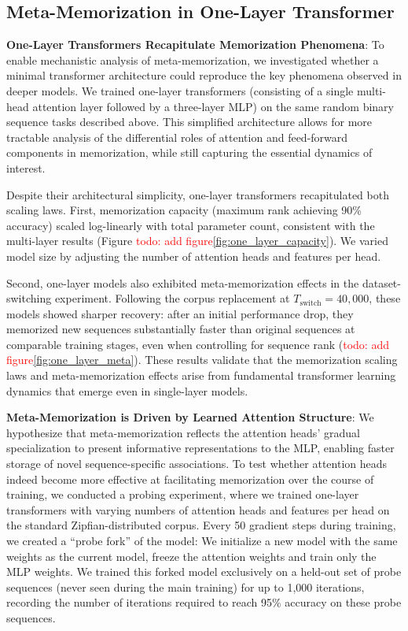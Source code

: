 \documentclass{article}
\theoremstyle{plain}
\theoremstyle{definition}
\theoremstyle{remark}
\begin{document}
\subsection{Meta-Memorization in One-Layer Transformer} 
 

\textbf{One-Layer Transformers Recapitulate Memorization Phenomena}:
To enable mechanistic analysis of meta-memorization, 
we investigated whether a minimal transformer architecture could reproduce the key phenomena observed in deeper models. 
We trained one-layer transformers (consisting of a single multi-head attention layer followed by a three-layer MLP)
 on the same random binary sequence tasks described above. 
 This simplified architecture allows for more tractable analysis of the differential roles of attention and feed-forward components
  in memorization, while still capturing the essential dynamics of interest.

Despite their architectural simplicity, one-layer transformers recapitulated both scaling laws.
 First, memorization capacity (maximum rank achieving 90\% accuracy) scaled log-linearly 
 with total parameter count, consistent with the multi-layer results (Figure \textcolor{red}{todo: add figure}\ref{fig:one_layer_capacity}). 
 We varied model size by adjusting the number of attention heads and features per head.

Second, one-layer models also exhibited meta-memorization effects in the dataset-switching experiment. 
Following the corpus replacement at $T_{\text{switch}}=40{,}000$,  
these models showed sharper recovery: after an initial performance drop,  
they memorized new sequences substantially faster than original sequences at comparable training stages,
 even when controlling for sequence rank (\textcolor{red}{todo: add figure}\ref{fig:one_layer_meta}).  
These results validate that the memorization scaling laws and meta-memorization effects  
arise from fundamental transformer learning dynamics that emerge even in single-layer models.  
 
\textbf{Meta-Memorization is Driven by Learned Attention Structure}:
We hypothesize that meta-memorization reflects the attention heads' gradual
 specialization to present informative representations to the MLP, 
 enabling faster storage of novel sequence-specific associations.
  To test whether attention heads indeed become more effective at facilitating 
  memorization over the course of training, 
  we conducted a probing experiment, where we trained one-layer transformers with varying numbers of attention heads and features per head on the standard Zipfian-distributed corpus. 
  Every 50 gradient steps during training, we created a ``probe fork'' of the model: We initialize 
  a new model with the same weights as the current model, freeze 
  the attention weights and train only the MLP weights. 
   We trained this forked model exclusively on a held-out set of probe sequences 
   (never seen during the main training) for up to 1,000 iterations, 
   recording the number of iterations required to reach 95\% accuracy on these probe sequences.
\end{document}
